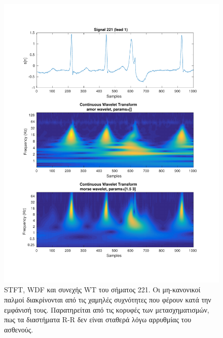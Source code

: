 \documentclass[11pt,a4paper]{article}
\begin{document}
\begin{figure}[H]
\begin{minipage}{0.48\textwidth}
	\includegraphics[width=\textwidth]{fig/221l1_cwt.pdf}
\end{minipage}
\vfill
\caption{STFT, WDF και συνεχής WT του σήματος 221. Οι μη-κανονικοί παλμοί διακρίνονται από τις χαμηλές συχνότητες που φέρουν κατά την εμφάνισή τους. Παρατηρείται από τις κορυφές των μετασχηματισμών, πως τα διαστήματα R-R δεν είναι σταθερά λόγω αρρυθμίας του ασθενούς.}
\label{fig:221l1_stft_wdf_wt}
\end{figure}
\end{document}
